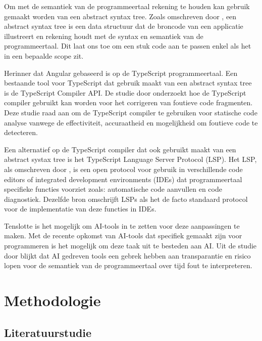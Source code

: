 Om met de semantiek van de programmeertaal rekening te houden kan gebruik gemaakt worden van een abstract syntax tree.
Zoals omschreven door \textcite{Sun2023}, een abstract syntax tree is een data structuur dat de broncode van een applicatie illustreert en rekening houdt met de syntax en semantiek van de programmeertaal.
Dit laat ons toe om een stuk code aan te passen enkel als het in een bepaalde scope zit.

Herinner dat Angular gebaseerd is op de TypeScript programmeertaal.
Een bestaande tool voor TypeScript dat gebruik maakt van een abstract syntax tree is de TypeScript Compiler API.
De studie door \textcite{Reid2023} onderzoekt hoe de TypeScript compiler gebruikt kan worden voor het corrigeren van foutieve code fragmenten. 
Deze studie raad aan om de TypeScript compiler te gebruiken voor statische code analyse vanwege de effectiviteit, accuraatheid en mogelijkheid om foutieve code te detecteren.

Een alternatief op de TypeScript compiler dat ook gebruikt maakt van een abstract systax tree is het TypeScript Language Server Protocol (LSP).
Het LSP, als omschreven door \textcite{Bork2023}, is een open protocol voor gebruik in verschillende code editors of integrated development environments (IDEs) dat programmeertaal specifieke functies voorziet zoals: automatische code aanvullen en code diagnostiek. 
Dezelfde bron omschrijft LSPs als het de facto standaard protocol voor de implementatie van deze functies in IDEs.

Tenslotte is het mogelijk om AI-tools in te zetten voor deze aanpassingen te maken.
Met de recente opkomst van AI-tools dat specifiek gemaakt zijn voor programmeren is het mogelijk om deze taak uit te besteden aan AI.
Uit de studie door \textcite{Hodovychenko2025} blijkt dat AI gedreven tools een gebrek hebben aan transparantie en risico lopen voor de semantiek van de programmeertaal over tijd fout te interpreteren.

\section{Methodologie}
\label{sec:methodologie}

\subsection{Literatuurstudie}
\label{sec:methodologie:literatuurstudie}


